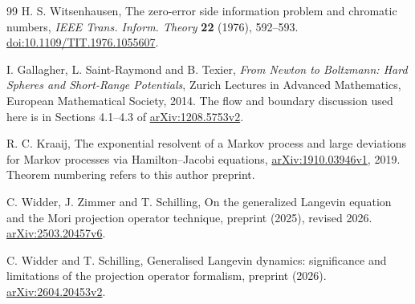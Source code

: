 \begin{thebibliography}{99}
H. S. Witsenhausen, The zero-error side information problem and chromatic
numbers, \emph{IEEE Trans. Inform. Theory} \textbf{22} (1976), 592--593.
\href{https://doi.org/10.1109/TIT.1976.1055607}{doi:10.1109/TIT.1976.1055607}.

I. Gallagher, L. Saint-Raymond and B. Texier,
\emph{From Newton to Boltzmann: Hard Spheres and Short-Range Potentials},
Zurich Lectures in Advanced Mathematics, European Mathematical Society, 2014.
The flow and boundary discussion used here is in Sections 4.1--4.3 of
\href{https://arxiv.org/abs/1208.5753v2}{arXiv:1208.5753v2}.

R. C. Kraaij, The exponential resolvent of a Markov process and large
deviations for Markov processes via Hamilton--Jacobi equations,
\href{https://arxiv.org/abs/1910.03946v1}{arXiv:1910.03946v1}, 2019.
Theorem numbering refers to this author preprint.


C. Widder, J. Zimmer and T. Schilling,
On the generalized Langevin equation and the Mori projection operator technique,
preprint (2025), revised 2026.
\href{https://arxiv.org/abs/2503.20457v6}{arXiv:2503.20457v6}.

C. Widder and T. Schilling,
Generalised Langevin dynamics: significance and limitations of the
projection operator formalism, preprint (2026).
\href{https://arxiv.org/abs/2604.20453v2}{arXiv:2604.20453v2}.

\end{thebibliography}

